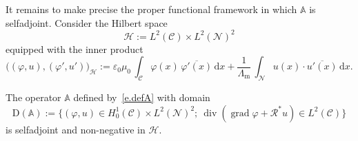 \documentclass[AHL,Unicode,longabstracts]{cedram}
\DeclareMathOperator{\Div}{div}
\DeclareMathOperator{\grad}{grad}
\newcommand{\epsl}{\varepsilon}
\newcommand{\calC}{\mathcal{C}}
\newcommand{\calH}{\mathcal{H}}
\newcommand{\calN}{\mathcal{N}}
\newcommand{\calR}{\mathcal{R}}
\newcommand{\bbA}{\mathbb{A}}
\newcommand{\rmd}{{\mathrm{d}}}
\newcommand{\rmD}{{\mathrm{D}}}
\newcommand{\Lm}{{\Lambda_{\mathrm{m}}}}
\begin{document}
It remains to make precise the proper functional framework in which $\bbA$ is selfadjoint. Consider the Hilbert space
\[
\calH := L^2(\calC) \times L^2(\calN)^2
\]
equipped with the inner product
\begin{equation}\label{e.def-inner-prod}
\Big((\varphi,u), (\varphi',u') \Big)_\calH :=
\epsl_0 \mu_0 \, \int_\calC \varphi(x) \, \overline{\varphi'(x)} \,\rmd x + \frac{1}{\Lm} \, \int_\calN u(x) \cdot \overline{u'(x)} \,\rmd x.
\end{equation}

\begin{prop}
The operator $\bbA$ defined by~\eqref{e.defA} with domain
\begin{equation}\label{e.def-Dom-A}
\rmD(\bbA) := \Big\{ (\varphi,u) \in H^1_0(\calC) \times L^2(\calN)^2; \
\Div(\grad \varphi + \calR^* u) \in L^2(\calC) \Big\}
\end{equation}
is selfadjoint and non-negative in $\calH$.\label{p.A-selfadjoint}
\end{prop}
\end{document}
